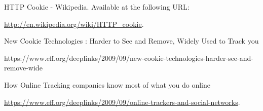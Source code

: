 \begin{thebibliography}{10}


HTTP Cookie - Wikipedia. Available at the following URL:

\newblock \url{http://en.wikipedia.org/wiki/HTTP_cookie}.

New Cookie Technologies : Harder to See and Remove, Widely Used to Track you 


https://www.eff.org/deeplinks/2009/09/new-cookie-technologies-harder-see-and-remove-wide



How Online Tracking companies know most of what you do online

\newblock \url{https://www.eff.org/deeplinks/2009/09/online-trackers-and-social-networks}.


\end{thebibliography}




